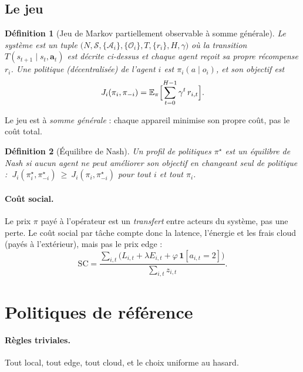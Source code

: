 \documentclass[11pt,a4paper]{article}
\newtheorem{definition}{Définition}
\newcommand{\E}{\mathbb{E}}
\newcommand{\ind}{\mathbf{1}}
\begin{document}
\subsection{Le jeu}

\begin{definition}[Jeu de Markov partiellement observable à somme générale]
Le système est un tuple $\bigl(N,\mathcal{S},\{\mathcal{A}_i\},\{\mathcal{O}_i\},T,\{r_i\},H,\gamma\bigr)$
où la transition $T(s_{t+1}\mid s_t,\bm a_t)$ est décrite ci-dessus et chaque agent reçoit sa propre récompense
$r_i$. Une politique (décentralisée) de l'agent $i$ est $\pi_i(a\mid o_i)$, et son objectif est
\begin{equation}
  J_i(\pi_i,\pi_{-i}) = \E_{\pi}\Bigl[\sum_{t=0}^{H-1}\gamma^t\,r_{i,t}\Bigr].
\end{equation}
\end{definition}

Le jeu est à \emph{somme générale} : chaque appareil minimise son propre coût, pas le coût total.

\begin{definition}[Équilibre de Nash]
Un profil de politiques $\pi^\star$ est un équilibre de Nash si aucun agent ne peut améliorer son objectif en
changeant seul de politique :
$\ J_i(\pi_i^\star,\pi_{-i}^\star)\ \ge\ J_i(\pi_i,\pi_{-i}^\star)$ pour tout $i$ et tout $\pi_i$.
\end{definition}

\paragraph{Coût social.} Le prix $\pi$ payé à l'opérateur est un \emph{transfert} entre acteurs du système, pas
une perte. Le coût social par tâche compte donc la latence, l'énergie et les frais cloud (payés à l'extérieur),
mais pas le prix edge :
\begin{equation}
  \mathrm{SC} = \frac{\sum_{i,t}\bigl(L_{i,t}+\lambda E_{i,t}+\varphi\,\ind[a_{i,t}=2]\bigr)}{\sum_{i,t} z_{i,t}} .
\end{equation}

\section{Politiques de référence}

\paragraph{Règles triviales.} Tout local, tout edge, tout cloud, et le choix uniforme au hasard.
\end{document}
